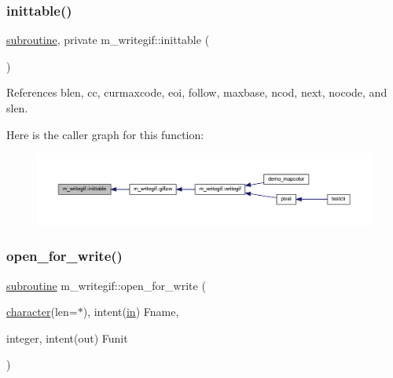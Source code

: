 \subsubsection{\texorpdfstring{inittable()}{inittable()}}
{\footnotesize\ttfamily \hyperlink{M__stopwatch_83_8txt_acfbcff50169d691ff02d4a123ed70482}{subroutine}, private m\+\_\+writegif\+::inittable (\begin{DoxyParamCaption}{ }\end{DoxyParamCaption})\hspace{0.3cm}{\ttfamily [private]}}



References blen, cc, curmaxcode, eoi, follow, maxbase, ncod, next, nocode, and slen.

Here is the caller graph for this function\+:
\nopagebreak
\begin{figure}[H]
\begin{center}
\leavevmode
\includegraphics[width=350pt]{namespacem__writegif_aed61b15f90188ddf39b71aa0c73a82a8_icgraph}
\end{center}
\end{figure}
\mbox{\label{namespacem__writegif_adb045213dd61508ad7dc7e5640fde67d}} 
\subsubsection{\texorpdfstring{open\+\_\+for\+\_\+write()}{open\_for\_write()}}
{\footnotesize\ttfamily \hyperlink{M__stopwatch_83_8txt_acfbcff50169d691ff02d4a123ed70482}{subroutine} m\+\_\+writegif\+::open\+\_\+for\+\_\+write (\begin{DoxyParamCaption}\item[{\hyperlink{option__stopwatch_83_8txt_abd4b21fbbd175834027b5224bfe97e66}{character}(len=$\ast$), intent(\hyperlink{M__journal_83_8txt_afce72651d1eed785a2132bee863b2f38}{in})}]{Fname,  }\item[{integer, intent(out)}]{Funit }\end{DoxyParamCaption})\hspace{0.3cm}{\ttfamily [private]}}



